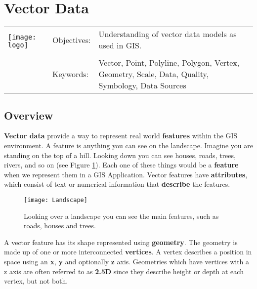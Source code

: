 

\section{Vector Data}\label{sec:vectordata}
\begin{tabular}{p{3.5cm}p{6cm}p{6cm}}
\multirow{2}{*}{\texttt{[image: logo]}} & Objectives: &
Understanding of vector data models as used in GIS. \\
& & \\
& Keywords: & 
Vector, Point, Polyline, Polygon, Vertex, Geometry, Scale, Data, Quality,
Symbology, Data Sources  \\
\hline
\end{tabular}

\subsection{Overview}\label{subsec:overview}

\textbf{Vector data} provide a way to represent real world \textbf{features}
within the GIS environment. A feature is anything you can see on the
landscape. Imagine you are standing on the top of a hill. Looking down you
can see houses, roads, trees, rivers, and so on (see Figure
\ref{fig:landscape}). Each one of these things would be a \textbf{feature}
when we represent them in a GIS Application. Vector features have
\textbf{attributes}, which consist of text or numerical information that
\textbf{describe} the features.

\begin{figure}[ht]
   \begin{center}
   \caption{Looking over a landscape you can see the main features, such
as roads, houses and trees.}
\label{fig:landscape}\smallskip
   \texttt{[image: Landscape]}
\end{center}
\end{figure}

A vector feature has its shape represented using \textbf{geometry}. The
geometry is made up of one or more interconnected \textbf{vertices}. A vertex
describes a position in space using an \textbf{x}, \textbf{y} and optionally
\textbf{z} axis. Geometries which have vertices with a z axis are often
referred to as \textbf{2.5D} since they describe height or depth at each
vertex, but not both.

